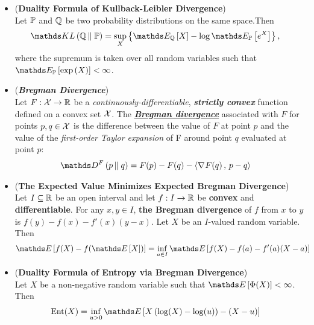 \documentclass[11pt]{article}
\begin{document}
\begin{itemize}
\item \begin{corollary}  (\textbf{Duality Formula of Kullback-Leibler Divergence}) \citep{thomas2006elements, boucheron2013concentration}\\
Let ${\mathbb P}$ and ${\mathbb Q}$ be two probability distributions on the same space.Then
\begin{align}
\kl{\bQ}{\bP} &= \sup_{X}\set{\E{\bQ}{X} - \log \E{\bP}{e^{X}} }, \label{eqn: duality_kl_divg}
\end{align} where the supremum is taken over all random variables such that $\E{\bP}{\exp\paren{X}} < \infty$.
\end{corollary}

\item \begin{definition} (\textbf{\emph{Bregman Divergence}}) \\
Let $F: {\mathcal X} \rightarrow {\mathbb R}$ be a \emph{continuously-differentiable}, \emph{\textbf{strictly convex}} function defined on a convex set ${\mathcal X}$. The \underline{\textbf{\emph{Bregman divergence}}} associated with $F$ for points $p,q \in {\mathcal X}$ is the difference between the value of $F$ at point $p$ and the value of the \emph{first-order Taylor expansion} of F around point $q$ evaluated at point $p$:
\begin{align}
\divg{F}{p}{q} &= F(p) - F(q) - \inn{\grad{}{F}(q)}{p - q} \label{eqn: bregman_divg}
\end{align}
\end{definition}

\item \begin{theorem} (\textbf{The Expected Value Minimizes Expected Bregman Divergence}) \citep{boucheron2013concentration} \\
Let $I \subseteq {\mathbb R}$ be an open interval and let $f: I \to {\mathbb R}$ be \textbf{convex} and \textbf{differentiable}. For any $x,y \in I$, \textbf{the Bregman divergence} of $f$ from $x$ to $y$ is $f(y) - f(x) - f'(x)(y-x)$. Let $X$ be an $I$-valued random variable. Then
\begin{align}
\E{}{f(X) - f(\E{}{X}) } &= \inf_{a \in I}\E{}{f(X) - f(a) - f'(a)(X-a)}\label{eqn: bregmann_inf}
\end{align}
\end{theorem}

\item \begin{corollary} (\textbf{Duality Formula of Entropy via Bregman Divergence}) \citep{boucheron2013concentration}\\
Let $X$ be a non-negative random variable such that $\E{}{\Phi(X)} < \infty$. Then 
\begin{align}
\text{Ent}(X) &= \inf_{u > 0}\E{}{X\paren{\log(X) - \log(u)} - (X - u) } \label{eqn: duality_entropy_3_breg}
\end{align}
\end{corollary}
\end{itemize}
\end{document}
